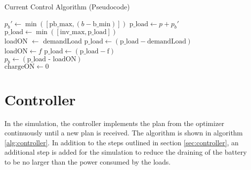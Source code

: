 \begin{algorithm}
\caption{Current Control Algorithm (Pseudocode)}\label{alg:current_control}
    \begin{algorithmic}
    
        \State $p_b' \gets \min([\text{pb\_max}, (b - \text{b\_min})])$
        \State $\text{p\_load} \gets p + p_b'$
        \State $\text{p\_load} \gets \min([\text{inv\_max}, \text{p\_load}])$       \\
        
    
                                                    
                \State loadON $\gets$ demandLoad
                \State $\text{p\_load} \gets (\text{p\_load} - \text{demandLoad}) $       
            \EndIf
        \EndFor\\
    
                                    
                    \State $\text{loadON} \gets f $                                    
                    \State $\text{p\_load} \gets (\text{p\_load} - \text{f}) $       
                \EndIf
            \EndIf
        \EndFor\\

        \State $p_b \gets (\text{p\_load - loadON})$\\
        
            \State $\text{chargeON} \gets 0$                                
        \EndIf\\
    \end{algorithmic}
\end{algorithm}


\section{Controller}
In the simulation, the controller implements the plan from the optimizer continuously until a new plan is received. The algorithm is shown in algorithm \ref{alg:controller}. In addition to the steps outlined in section \ref{sec:controller}, an additional step is added for the simulation to reduce the draining of the battery to be no larger than the power consumed by the loads. 

